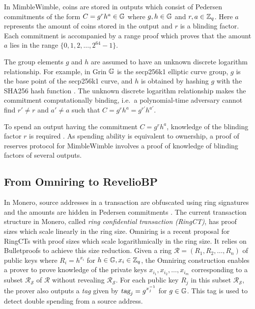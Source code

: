 In MimbleWimble, coins are stored in outputs which consist of Pedersen commitments of the form $C = g^rh^a\in \mathbb{G}$ where $g , h \in \mathbb{G}$ and $r,a \in \mathbb{Z}_q$. Here $a$ represents the amount of coins stored in the output and $r$ is a blinding factor. Each commitment is accompanied by a range proof which proves that the amount $a$ lies in the range $\{0,1,2,\ldots,2^{64}-1\}$.

The group elements $g$ and $h$ are assumed to have an unknown discrete logarithm relationship. For example, in Grin $\mathbb{G}$ is the secp256k1 elliptic curve group, $g$ is the base point of the secp256k1 curve, and $h$ is obtained by hashing $g$ with the SHA256 hash function \cite{RustSecp256k1Constants}. The unknown discrete logarithm relationship makes the commitment computationally binding, i.e.~a polynomial-time adversary cannot find $r' \neq r$ and $a' \neq a$ such that $C = g^rh^a = g^{r'}h^{a'}$.

To spend an output having the commitment $C = g^r h^a$, knowledge of the blinding factor $r$ is required \cite{GrinDocOnGithub}. As spending ability is equivalent to ownership, a proof of reserves protocol for MimbleWimble involves a proof of knowledge of blinding factors of several outputs.

\vspace{-2pt}
\subsection{From Omniring to \textnormal{{\selectfont RevelioBP}}}
In Monero, source addresses in a transaction are obfuscated using ring signatures and the amounts are hidden in Pedersen commitments \cite{Noether2016}. 
The current transaction structure in Monero, called \textit{ring confidential transaction (RingCT)}, has proof sizes which scale linearly in the ring size. Omniring \cite{Lai2019} is a recent proposal for RingCTs with proof sizes which scale logarithmically in the ring size. It relies on Bulletproofs \cite{Bunz2018} to achieve this size reduction. Given a ring $\mathcal{R} = (R_1, R_2,\ldots,R_n)$ of public keys where $R_i = h^{x_i}$ for $h \in \mathbb{G}, x_i \in \mathbb{Z}_q$, the Omniring construction enables a prover to prove knowledge of the private keys $x_{i_1}, x_{i_2},\ldots,x_{i_m}$ corresponding to a subset $\mathcal{R}_{\mathcal{S}}$ of $\mathcal{R}$ without revealing $\mathcal{R}_{\mathcal{S}}$. For each public key $R_j$ in this subset $\mathcal{R}_{\mathcal{S}}$, the prover also outputs a \textit{tag} given by $\textsl{tag}_j = g^{x_j^{-1}}$ for $g \in \mathbb{G}$. This tag is used to detect double spending from a source address.

